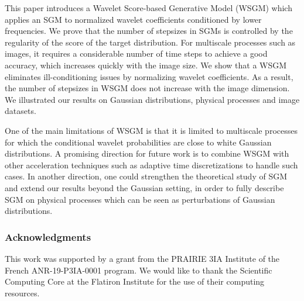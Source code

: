 \documentclass{article}
\begin{document}
This paper introduces a Wavelet Score-based Generative Model (WSGM)
which applies an SGM to normalized wavelet coefficients conditioned by lower frequencies.
We prove that the number of
stepsizes in SGMs is controlled by the regularity of the score of the target
distribution. For multiscale processes such as images, it requires a considerable number
of time steps to achieve a good accuracy, which increases quickly with the image size.
We show that a WSGM eliminates ill-conditioning issues by normalizing 
wavelet coefficients. As a result, the number of stepsizes in WSGM does not increase
with the image dimension.
We illustrated our results on Gaussian
distributions, physical processes and image datasets.

One of the main limitations of WSGM is that it is limited to multiscale processes for which the conditional wavelet probabilities are close to white Gaussian distributions. A promising direction for future work is to combine WSGM with other acceleration techniques such as adaptive time discretizations to handle such cases.
In another direction, one could strengthen the theoretical
study of SGM and extend our results beyond the Gaussian setting, in
order to fully describe SGM on physical processes which can be seen as
perturbations of Gaussian distributions.

\subsubsection*{Acknowledgments}
This work was supported by a grant from the PRAIRIE 3IA Institute of the French ANR-19-P3IA-0001 program. We would like to thank the Scientific Computing Core at the Flatiron Institute for the use of their computing resources.




\end{document}

